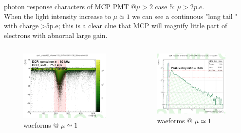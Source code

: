 \documentclass[11pt,compress,xcolor=x11names,UTF8]{beamer}
\begin{document}
\begin{frame}{photon response characters of MCP PMT @$\mu >2$ }
	case 5: $\mu >2p.e.$\\
	When the light intensity increase to $\mu\simeq 1$ we can see a continuous "long tail " with charge >5p.e; this is a clear clue that MCP will magnify little part of electrons  with abnornal large gain. 
\begin{columns}
\begin{column}{.495\textwidth}
\begin{figure}
\centering
\includegraphics[width=0.97\textwidth]{figure/onepewave.png} %
\caption{waeforms @ $\mu\simeq  1$}
\end{figure}
\end{column}
\begin{column}{.475\textwidth}
\begin{figure}
\centering
\includegraphics[width=0.94\textwidth]{figure/onepeqdc.png} %
\caption{waeforms @ $\mu\simeq  1$}
\end{figure}
\end{column}
\end{columns}
\end{frame}
\end{document}
